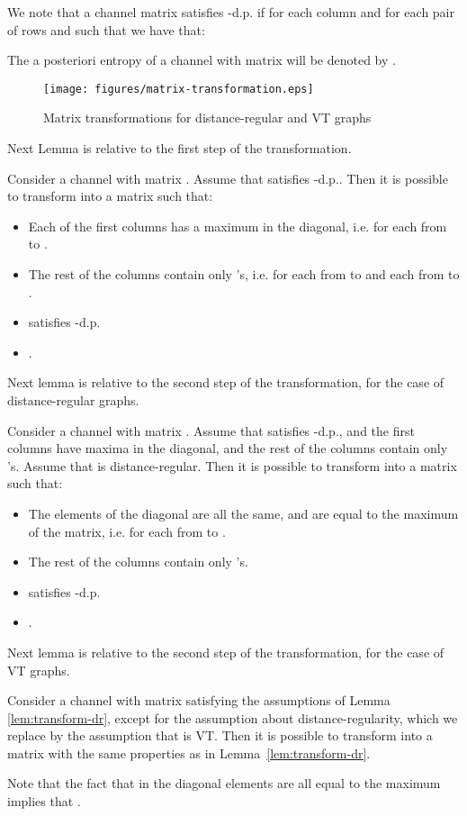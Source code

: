 \documentclass{llncs}
\begin{document}
We note that a channel matrix  satisfies -d.p.  if for each column  and for each pair of rows  and  such that  we have that:

The a posteriori entropy of a channel with matrix  will be denoted by . 

\begin{figure}[t]\centering
		\texttt{[image: figures/matrix-transformation.eps]}\caption{Matrix transformations for distance-regular and VT graphs}\label{fig:mat-transf}\end{figure}

Next Lemma is relative to the first step of the transformation. 
\begin{lemma}\label{lem:transform-diagonal}
Consider a channel with matrix . Assume that  satisfies -d.p.. Then it is possible to transform  into a matrix  such that: 
\begin{itemize}
\item Each of the first  columns has a maximum in the diagonal, i.e.  for each  from  to . 
\item The rest of the columns contain only 's, i.e.  for each  from  to  and each  from  to .
\item  satisfies -d.p.
\item . 
\end{itemize}
\end{lemma}

Next lemma is relative to the second step of the transformation, for the case of distance-regular graphs. 

\begin{lemma}\label{lem:transform-dr}
Consider a channel with matrix . Assume that  satisfies -d.p., and the first  columns have  maxima   in the diagonal,  and the rest of the columns contain only 's. Assume that  is distance-regular. Then it is possible to transform  into a matrix  such that: 
\begin{itemize}
\item The elements of the diagonal are all the same, and are equal to the maximum of the matrix, i.e.  for each  from  to . 
\item The rest of the columns contain only 's.
\item  satisfies -d.p.
\item . 
\end{itemize}
\end{lemma}

Next lemma is relative to the second step of the transformation, for the case of VT graphs. 
\begin{lemma}\label{lem:transform-vt++}
Consider a channel with matrix  satisfying the assumptions of Lemma \ref{lem:transform-dr}, except for the assumption about distance-regularity, which we replace by the assumption that  is VT. 
Then it is possible to transform  into a matrix  with the same properties as in Lemma~\ref{lem:transform-dr}.
\end{lemma}
Note that the fact that in  the diagonal elements are all equal to the maximum  implies that . 
\end{document}
